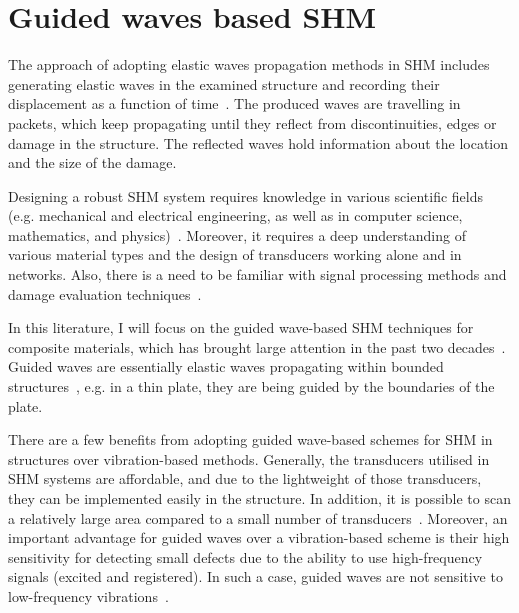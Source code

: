 \section[Guided waves based SHM]{Guided waves based SHM}
\label{sec22}
The approach of adopting elastic waves propagation methods in SHM includes generating elastic waves in the examined structure and recording their displacement as a function of time~\cite{Ostachowicz2012}. 
The produced waves are travelling in packets, which keep propagating until they reflect from discontinuities, edges or damage in the structure. The reflected waves hold information about the location and the size of the damage.  

Designing a robust SHM system requires knowledge in various scientific fields (e.g. mechanical and electrical engineering, as well as in computer science, mathematics, and physics)~\cite{Willberg2013}.
Moreover, it requires a deep understanding of various material types and the design of transducers working alone and in networks. 
Also, there is a need to be familiar with signal processing methods and damage evaluation techniques~\cite{Willberg2013}.

In this literature, I will focus on the guided wave-based SHM techniques for composite materials, which has brought large attention in the past two decades~\cite{Mitra2016}.
Guided waves are essentially elastic waves propagating within bounded 
structures~\cite{Mitra2016}, e.g. in a thin plate, they are being guided by the boundaries of the plate. 

There are a few benefits from adopting guided wave-based schemes for SHM in structures over vibration-based methods. 
Generally, the transducers utilised in SHM systems are affordable, and due to the lightweight of those transducers, they can be implemented easily in the structure.
In addition, it is possible to scan a relatively large area compared to a small number of transducers~\cite{Mitra2016}. 
Moreover, an important advantage for guided waves over a vibration-based scheme is their high sensitivity for detecting small defects due to the ability to use high-frequency signals (excited and registered).
In such a case, guided waves are not sensitive to low-frequency vibrations~\cite{Mitra2016,Croxford2007}.

